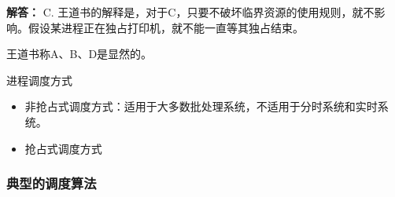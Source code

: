 \documentclass[12pt, a4paper, oneside]{ctexart}
\newenvironment{solution}{\begin{shaded}\par\noindent\textbf{解答：}}{\end{shaded}\par}
\begin{document}
\begin{solution}
  C. 王道书的解释是，对于C，只要不破坏临界资源的使用规则，就不影响。假设某进程正在独占打印机，就不能一直等其独占结束。

  王道书称A、B、D是显然的。
\end{solution}

进程调度方式
\begin{itemize}
  \item 非抢占式调度方式：适用于大多数批处理系统，不适用于分时系统和实时系统。
  \item 抢占式调度方式
\end{itemize}

\subsubsection{典型的调度算法}
\end{document}
